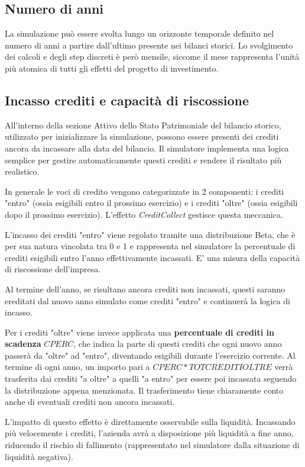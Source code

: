 \documentclass{article}
\begin{document}
\subsection{Numero di anni}
La simulazione può essere svolta lungo un orizzonte temporale definito nel numero di anni a partire dall'ultimo presente nei bilanci storici. 
Lo svolgimento dei calcoli e degli step discreti è però mensile, siccome il mese rappresenta l'unità più atomica di tutti gli effetti del progetto di investimento. 

\subsection{Incasso crediti e capacità di riscossione}
All'interno della sezione Attivo dello Stato Patrimoniale del bilancio storico, utilizzato per inizializzare la simulazione, possono essere presenti dei crediti ancora da incassare alla data del bilancio. 
Il simulatore implementa una logica semplice per gestire automaticamente questi crediti e rendere il risultato più realistico. 

In generale le voci di credito vengono categorizzate in 2 componenti: i crediti "entro" (ossia esigibili entro il prossimo esercizio) e i crediti "oltre" (ossia esigibili dopo il prossimo esercizio). 
L'effetto \textit{CreditCollect} gestisce questa meccanica. 

L'incasso dei crediti "entro" viene regolato tramite una distribuzione Beta, che è per sua natura vincolata tra 0 e 1 e rappresenta nel simulatore la percentuale di crediti esigibili entro l'anno effettivamente incassati. E' una misura della capacità di riscossione dell'impresa. 

Al termine dell'anno, se risultano ancora crediti non incassati, questi saranno ereditati dal nuovo anno simulato come crediti "entro" e continuerà la logica di incasso. 

Per i crediti "oltre" viene invece applicata una \textbf{percentuale di crediti in scadenza} $CPERC$, che indica la parte di questi crediti che ogni nuovo anno passerà da "oltre" ad "entro", diventando esigibili durante l'esercizio corrente. Al termine di ogni anno, un importo pari a $CPERC * TOT CREDITI OLTRE$ verrà trasferita dai crediti "a oltre" a quelli "a entro" per essere poi incassata seguendo la distribuzione appena menzionata. Il trasferimento tiene chiaramente conto anche di eventuali crediti non ancora incassati. 

L'impatto di questo effetto è direttamente osservabile sulla liquidità. Incassando più velocemente i crediti, l'azienda avrà a disposizione più liquidità a fine anno, riducendo il rischio di fallimento (rappresentato nel simulatore dalla situazione di liquidità negativa). 
\end{document}

